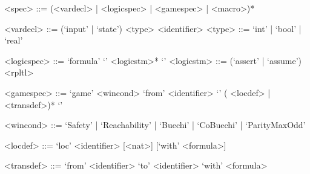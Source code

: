 \begin{grammar}

<spec> ::= (<vardecl> | <logicspec> | <gamespec> | <macro>)*
 
 \smallskip 
 
<vardecl> ::= (`input' | `state') <type> <identifier> \quad  <type>    ::= `int' | `bool' | `real'

 \smallskip 

<logicspec> ::=  `formula' `{' <logicstm>*  `}'  \quad <logicstm> ::= (`assert' | `assume') <rpltl>



\smallskip

<gamespec>  ::= `game' <wincond> `from' <identifier> `{' ( <locdef> | <transdef>)* `}' 

<wincond>  ::= `Safety' | `Reachability' | `Buechi'  | `CoBuechi' | `ParityMaxOdd'

<locdef>   ::= `loc' <identifier> [<nat>] [`with' <formula>]

<transdef>  ::= `from'  <identifier> `to' <identifier> `with' <formula>

\vspace{-.4cm}
\end{grammar}

